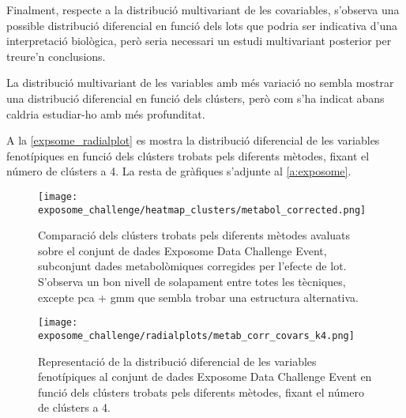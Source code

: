 \documentclass[CAT,BIB]{TFUOC}%
\begin{document}
        Finalment,
        respecte a la distribució multivariant de les covariables,
        s'observa una possible distribució diferencial en funció dels lots
        que podria ser indicativa d'una interpretació biològica,
        però seria necessari un estudi multivariant posterior
        per treure'n conclusions.

        La distribució multivariant de les variables amb més variació
        no sembla mostrar una distribució diferencial en funció dels clústers,
        però com s'ha indicat abans caldria estudiar-ho amb més profunditat.

        A la \cref{expsome_radialplot} es mostra la distribució diferencial
        de les variables fenotípiques
        en funció dels clústers trobats pels diferents mètodes,
        fixant el número de clústers a 4.
        La resta de gràfiques s'adjunte al \cref{a:exposome}.

        \begin{figure}[p]
            \centering
            \texttt{[image: exposome\_challenge/heatmap\_clusters/metabol\_corrected.png]}
            \caption[Comparació dels clústers pel conjunt de dades Exposome Data Challenge Event]{
                Comparació dels clústers trobats pels diferents mètodes avaluats
                sobre el conjunt de dades Exposome Data Challenge Event,
                subconjunt dades metabolòmiques corregides per l'efecte de lot.
                S'observa un bon nivell de solapament entre totes les tècniques,
                excepte \gls{pca} + \gls{gmm} que sembla trobar una estructura alternativa.
            }
            \label{f:expsome_heatmap}
        \end{figure}

        \begin{figure}[p]
            \centering
            \texttt{[image: exposome\_challenge/radialplots/metab\_corr\_covars\_k4.png]}
            \caption[Distribució diferencial de les variables fenotip a Exposome Data Challenge Event]{
                Representació de la distribució diferencial
                de les variables fenotípiques al conjunt de dades Exposome Data Challenge Event
                en funció dels clústers trobats pels diferents mètodes,
                fixant el número de clústers a 4.
            }
            \label{f:expsome_radialplot}
        \end{figure}
\end{document}
